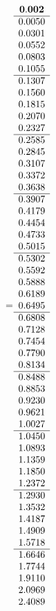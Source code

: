 =\hbox{$\begin{array}{c}
\bf 0.002 
 \\ \hline 
  0.0050 \\ 
  0.0301 \\ 
  0.0552 \\ 
  0.0803 \\ 
  0.1055
 \\ \hline 
  0.1307 \\ 
  0.1560 \\ 
  0.1815 \\ 
  0.2070 \\ 
  0.2327
 \\ \hline 
  0.2585 \\ 
  0.2845 \\ 
  0.3107 \\ 
  0.3372 \\ 
  0.3638
 \\ \hline 
  0.3907 \\ 
  0.4179 \\ 
  0.4454 \\ 
  0.4733 \\ 
  0.5015
 \\ \hline 
  0.5302 \\ 
  0.5592 \\ 
  0.5888 \\ 
  0.6189 \\ 
  0.6495
 \\ \hline 
  0.6808 \\ 
  0.7128 \\ 
  0.7454 \\ 
  0.7790 \\ 
  0.8134
 \\ \hline 
  0.8488 \\ 
  0.8853 \\ 
  0.9230 \\ 
  0.9621 \\ 
  1.0027
 \\ \hline 
  1.0450 \\ 
  1.0893 \\ 
  1.1359 \\ 
  1.1850 \\ 
  1.2372
 \\ \hline 
  1.2930 \\ 
  1.3532 \\ 
  1.4187 \\ 
  1.4909 \\ 
  1.5718
 \\ \hline 
  1.6646 \\ 
  1.7744 \\ 
  1.9110 \\ 
  2.0969 \\ 
  2.4089
 \end{array}$}
